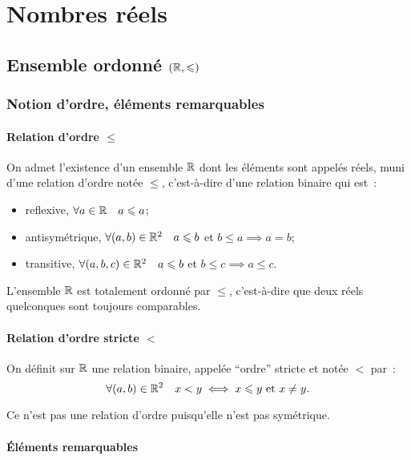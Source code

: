 \chapter{Nombres réels}
\label{chap:reels}
\minitoc
\minilof
\minilot
\section{Ensemble ordonné \((\mathbb{R}, \leqslant)\)}

\subsection{Notion d'ordre, éléments remarquables}

\subsubsection{Relation d'ordre \(\leqslant\)}

On admet l'existence d'un ensemble \(\mathbb{R}\) dont les éléments sont appelés réels, 
muni d'une relation d'ordre notée \(\leqslant\), c'est-à-dire d'une relation 
binaire qui est~:
\begin{itemize}
  \item reflexive, \(\forall a \in \mathbb{R} \quad a\leqslant a\);
  \item antisymétrique, \(\forall (a, b) \in \mathbb{R}^2 \quad a\leqslant b\) et \( 
    b\leqslant a \implies a = b\);
  \item transitive, \(\forall (a, b, c) \in \mathbb{R}^2 \quad a\leqslant b\) et 
    \(b\leqslant c \implies a\leqslant c\).
\end{itemize}
L'ensemble \(\mathbb{R}\) est totalement ordonné par \(\leqslant\), c'est-à-dire que 
deux réels quelconques sont toujours comparables.

\subsubsection{Relation d'ordre stricte \(<\)}

\begin{defdef}
  On définit sur \(\mathbb{R}\) une relation binaire, appelée ``ordre'' stricte et notée 
  \(<\) par~:
  \begin{equation}
    \forall (a, b) \in \mathbb{R}^2 \quad x<y \iff x\leqslant y \text{~et~} x\neq y.
  \end{equation}
\end{defdef}
Ce n'est pas une relation d'ordre puisqu'elle n'est pas symétrique.

\subsubsection{Éléments remarquables}

